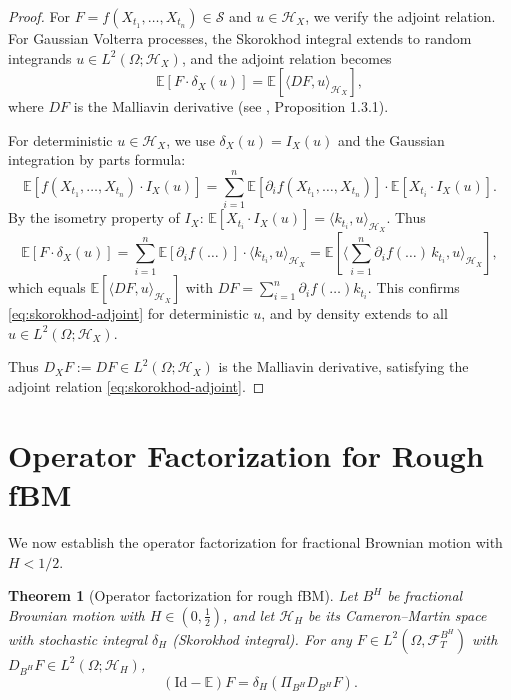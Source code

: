 \documentclass[11pt,a4paper]{article}
\theoremstyle{plain}
\newtheorem{theorem}{Theorem}[section]
\theoremstyle{definition}
\theoremstyle{remark}
\newcommand{\E}{\mathbb{E}}
\newcommand{\Id}{\mathrm{Id}}
\newcommand{\ip}[2]{\langle #1, #2 \rangle}
\newcommand{\Lp}[1]{L^{#1}}
\newcommand{\FT}{\mathcal{F}_T}
\newcommand{\HH}{\mathcal{H}_H}
\newcommand{\HX}{\mathcal{H}_X}
\begin{document}
\begin{proof}
For $F = f(X_{t_1}, \ldots, X_{t_n}) \in \mathcal{S}$ and $u \in \HX$, we verify the adjoint relation. For Gaussian Volterra processes, the Skorokhod integral extends to random integrands $u \in \Lp{2}(\Omega; \HX)$, and the adjoint relation becomes
\begin{equation}\label{eq:skorokhod-adjoint}
\E[F \cdot \delta_X(u)] = \E[\ip{DF}{u}_{\HX}],
\end{equation}
where $DF$ is the Malliavin derivative (see \cite{Nualart06}, Proposition 1.3.1).

For deterministic $u \in \HX$, we use $\delta_X(u) = I_X(u)$ and the Gaussian integration by parts formula:
\[
\E[f(X_{t_1}, \ldots, X_{t_n}) \cdot I_X(u)] = \sum_{i=1}^n \E\left[\partial_i f(X_{t_1}, \ldots, X_{t_n})\right] \cdot \E[X_{t_i} \cdot I_X(u)].
\]
By the isometry property of $I_X$: $\E[X_{t_i} \cdot I_X(u)] = \ip{k_{t_i}}{u}_{\HX}$. Thus
\[
\E[F \cdot \delta_X(u)] = \sum_{i=1}^n \E[\partial_i f(\ldots)] \cdot \ip{k_{t_i}}{u}_{\HX} = \E\left[\ip{\sum_{i=1}^n \partial_i f(\ldots) \, k_{t_i}}{u}_{\HX}\right],
\]
which equals $\E[\ip{DF}{u}_{\HX}]$ with $DF = \sum_{i=1}^n \partial_i f(\ldots) k_{t_i}$. This confirms \eqref{eq:skorokhod-adjoint} for deterministic $u$, and by density extends to all $u \in \Lp{2}(\Omega; \HX)$.

Thus $D_X F := DF \in \Lp{2}(\Omega; \HX)$ is the Malliavin derivative, satisfying the adjoint relation \eqref{eq:skorokhod-adjoint}.
\end{proof}

\section{Operator Factorization for Rough fBM}\label{sec:factorization}

We now establish the operator factorization for fractional Brownian motion with $H < 1/2$.

\begin{theorem}[Operator factorization for rough fBM]\label{thm:factorization-fBM}
Let $B^H$ be fractional Brownian motion with $H \in (0, \frac{1}{2})$, and let $\HH$ be its Cameron--Martin space with stochastic integral $\delta_H$ (Skorokhod integral). For any $F \in \Lp{2}(\Omega, \FT^{B^H})$ with $D_{B^H} F \in \Lp{2}(\Omega; \HH)$,
\begin{equation}\label{eq:factorization-fBM}
(\Id - \E)F = \delta_H(\Pi_{B^H} D_{B^H} F).
\end{equation}
\end{theorem}
\end{document}
